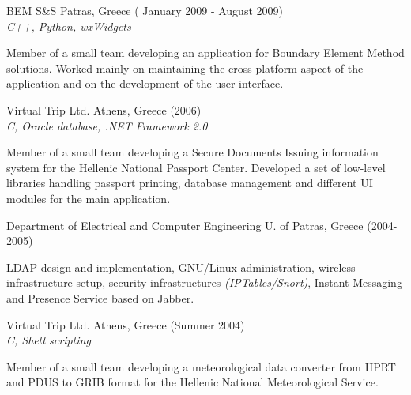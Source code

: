 \documentclass[alan.tex]{subfiles}
\begin{document}
  \item[BEM S\&S] Patras, Greece ( January 2009 - August 2009)\\
  \emph{C++, Python, wxWidgets}
  \begin{my_contractor}
  Member of a small team developing an application for Boundary Element Method solutions. Worked mainly on maintaining the cross-platform aspect of the application and on the development of the user interface. 
  \end{my_contractor}
  \item[Virtual Trip Ltd.] Athens, Greece (2006) \\
  \emph{ C, Oracle database, .NET Framework 2.0 }
  \begin{my_contractor}
    Member of a small team developing a Secure Documents Issuing information system for the Hellenic National Passport Center. 
    Developed a set of low-level libraries handling passport printing, database management and different UI modules for the main application.
  \end{my_contractor}
  \item[Department of Electrical and Computer Engineering] U. of Patras, Greece (2004-2005)
  \begin{my_contractor}
    LDAP design and implementation, GNU/Linux administration, wireless infrastructure setup, security infrastructures \emph{(IPTables/Snort)}, Instant Messaging and Presence Service based on Jabber.
  \end{my_contractor}
  \item[Virtual Trip Ltd.] Athens, Greece (Summer 2004) \\
  \emph{ C, Shell scripting }
  \begin{my_contractor}
    Member of a small team developing a meteorological data converter from HPRT and PDUS to GRIB format for the Hellenic National Meteorological Service. 
  \end{my_contractor}
\end{document}
